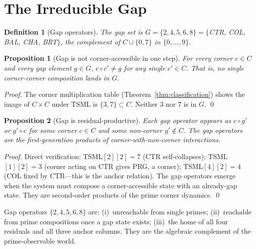 \documentclass[11pt]{article}
\newtheorem{proposition}{Proposition}
\newtheorem{definition}{Definition}
\begin{document}
\section{The Irreducible Gap}

\begin{definition}[Gap operators]
The \emph{gap set} is $G=\{2,4,5,6,8\}=\{$CTR, COL, BAL, CHA, BRT$\}$,
the complement of $C\cup\{0,7\}$ in $\{0,\ldots,9\}$.
\end{definition}

\begin{proposition}[Gap is not corner-accessible in one step]\label{prop:gap}
For every corner $c\in C$ and every gap element $g\in G$,
$c\circ c'\ne g$ for any single $c'\in C$.
That is, no single corner-corner composition lands in $G$.
\end{proposition}

\begin{proof}
The corner multiplication table (Theorem~\ref{thm:classification}) shows
the image of $C\times C$ under TSML is $\{3,7\}\subset C$.
Neither $3$ nor $7$ is in $G$. \qed
\end{proof}

\begin{proposition}[Gap is residual-productive]
Each gap operator appears as $c\circ g'$ or $g'\circ c$ for
some corner $c\in C$ and some non-corner $g'\notin C$.
The gap operators are the \emph{first-generation products}
of corner-with-non-corner interactions.
\end{proposition}

\begin{proof}
Direct verification: TSML$[2][2]=7$ (CTR self-collapses);
TSML$[1][2]=3$ (corner acting on CTR gives PRG, a corner);
TSML$[4][2]=4$ (COL fixed by CTR---this is the anchor relation).
The gap operators emerge when the system must compose a
corner-accessible state with an already-gap state.
They are second-order products of the prime corner dynamics. \qed
\end{proof}

\begin{tcolorbox}[colback=gray!8,colframe=black,
  title={The gap characterisation}]
Gap operators $\{2,4,5,6,8\}$ are:
(i)~unreachable from single primes;
(ii)~reachable from prime compositions once a gap state exists;
(iii)~the home of all four residuals and all three anchor columns.
They are the algebraic complement of the prime-observable world.
\end{tcolorbox}
\end{document}
